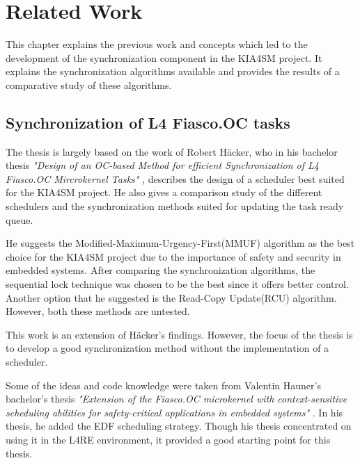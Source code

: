 \chapter{Related Work}
This chapter explains the previous work and concepts which led to the development of the synchronization component in the KIA4SM project. It explains the synchronization algorithms available and provides the results of a comparative study of these algorithms.  

\section{Synchronization of L4 Fiasco.OC tasks}

The thesis is largely based on the work of Robert H{\"a}cker, who in his bachelor thesis \textit{ "Design of an OC-based Method for efficient Synchronization of L4 Fiasco.OC Mircrokernel Tasks"} \cite{haecker}, describes the design of a scheduler best suited for the  KIA4SM project. He also gives a comparison study of the different schedulers and the synchronization methods suited for updating the task ready queue. 

He suggests the Modified-Maximum-Urgency-First(MMUF) algorithm as the best choice for the KIA4SM project due to the importance of safety and security in embedded systems. After comparing the synchronization algorithms, the sequential lock technique was chosen to be the best since it offers better control. Another option that he suggested is the Read-Copy Update(RCU) algorithm. However, both these methods are untested. 

This work is an extension of H{\"a}cker's findings. However, the focus of the thesis is to develop a good synchronization method without the implementation of a scheduler.

Some of the ideas and code knowledge were taken from Valentin Hauner's bachelor's thesis \textit{"Extension of the Fiasco.OC microkernel with context-sensitive scheduling abilities for safety-critical applications in embedded systems"} \cite{hauner}. In his thesis, he added the EDF scheduling strategy. Though his thesis concentrated on using it in the L4RE environment, it provided a good starting point for this thesis.

